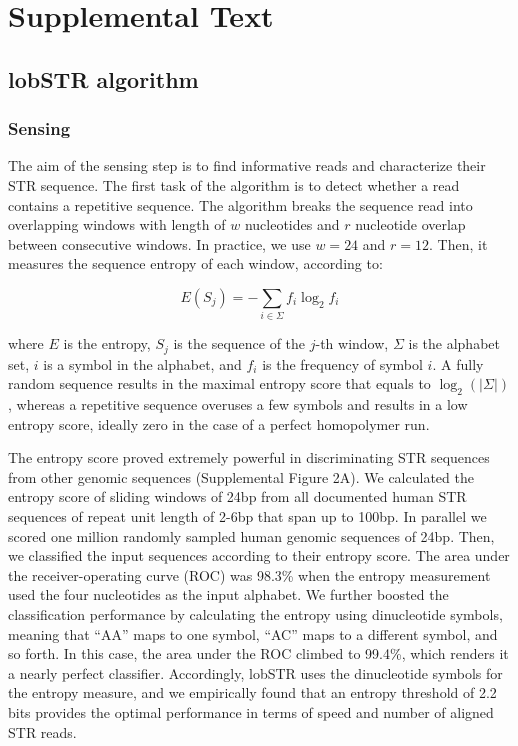 \section{Supplemental Text}
\subsection{lobSTR algorithm}

\subsubsection{Sensing}
The aim of the sensing step is to find informative reads and characterize their STR sequence. The first task of the algorithm is to detect whether a read contains a repetitive sequence. The algorithm breaks the sequence read into overlapping windows with length of $w$ nucleotides and $r$ nucleotide overlap between consecutive windows. In practice, we use $w=24$ and $r=12$. Then, it measures the sequence entropy of each window, according to:

\begin{equation}
E(S_j) = -\sum_{i \in \Sigma}f_i \log_2 f_i
\end{equation}

where $E$ is the entropy, $S_j$ is the sequence of the $j$-th window, $\Sigma$ is the alphabet set, $i$ is a symbol in the alphabet, and $f_i$ is the frequency of symbol $i$. A fully random sequence results in the maximal entropy score that equals to $\log_2(|\Sigma|)$, whereas a repetitive sequence overuses a few symbols and results in a low entropy score, ideally zero in the case of a perfect homopolymer run.

The entropy score proved extremely powerful in discriminating STR sequences from other genomic sequences (Supplemental Figure 2A). We calculated the entropy score of sliding windows of 24bp from all documented human STR sequences of repeat unit length of 2-6bp that span up to 100bp. In parallel we scored one million randomly sampled human genomic sequences of 24bp. Then, we classified the input sequences according to their entropy score. The area under the receiver-operating curve (ROC) was 98.3\% when the entropy measurement used the four nucleotides as the input alphabet. We further boosted the classification performance by calculating the entropy using dinucleotide symbols, meaning that “AA” maps to one symbol, “AC” maps to a different symbol, and so forth. In this case, the area under the ROC climbed to 99.4\%, which renders it a nearly perfect classifier. Accordingly, lobSTR uses the dinucleotide symbols for the entropy measure, and we empirically found that an entropy threshold of 2.2 bits provides the optimal performance in terms of speed and number of aligned STR reads.

